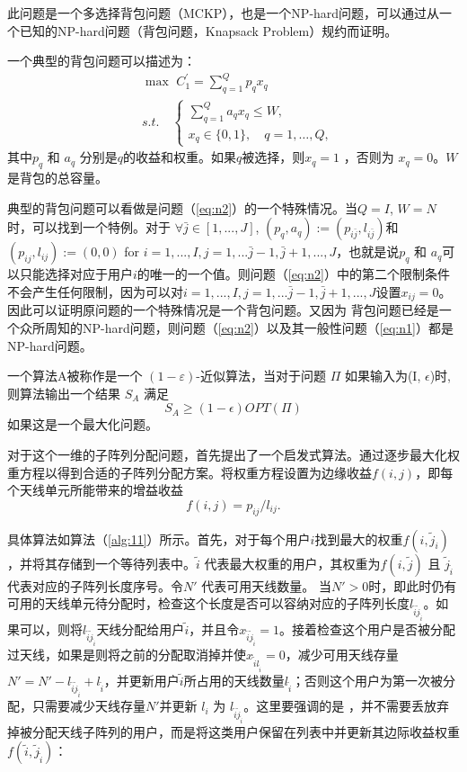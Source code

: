 此问题是一个多选择背包问题（MCKP），也是一个NP-hard问题，可以通过从一个已知的NP-hard问题（背包问题，Knapsack Problem）规约而证明。

一个典型的背包问题可以描述为：
\begin{equation}
\begin{split}
\label{eq:12}
&\max \,\, C_1^{'} = \sum\limits_{q=1}^{Q} p_{q} x_{q}\\
&s.t.\quad  \left\{\begin{array}{l}
\sum\limits_{q=1}^{Q} a_{q}x_{q}\leq W,\\
x_{q}\in\{0,1\}, \quad  q=1,\dots,Q,\end{array}\right.
\end{split}
\end{equation}
其中$p_q$ 和 $a_q$ 分别是$q$的收益和权重。如果$q$被选择，则$x_q=1$ ，否则为 $x_q=0$。$W$是背包的总容量。

典型的背包问题可以看做是问题（\ref{eq:n2}）的一个特殊情况。当$Q=I$, $W=N$时，可以找到一个特例。对于 $\forall \bar j \in [1,...,J]$, $(p_q,a_q):=(p_{i\bar j},l_{i\bar j})$和$(p_{ij},l_{ij}):= (0,0)$ for $i = 1,...,I, j= 1,...\bar j-1,\bar j+1,...,J$，也就是说$p_q$ 和 $a_q$可以只能选择对应于用户$i$的唯一的一个值。则问题（\ref{eq:n2}）中的第二个限制条件不会产生任何限制，因为可以对$i = 1,...,I, j= 1,...\bar j-1,\bar j+1,...,J$设置$x_{ij}=0$。因此可以证明原问题的一个特殊情况是一个背包问题。又因为 背包问题已经是一个众所周知的NP-hard问题，则问题（\ref{eq:n2}）以及其一般性问题（\ref{eq:n1}）都是NP-hard问题。

一个算法A被称作是一个 $(1-\varepsilon)$-近似算法，当对于问题 $\Pi$ 如果输入为(I, $\epsilon$)时, 则算法输出一个结果 $S_A$ 满足
\begin{equation}
S_A \geq (1-\epsilon)OPT(\Pi)
\end{equation}
如果这是一个最大化问题。


对于这个一维的子阵列分配问题，首先提出了一个启发式算法。通过逐步最大化权重方程以得到合适的子阵列分配方案。将权重方程设置为边缘收益$f(i,j)$，即每个天线单元所能带来的增益收益
\begin{equation}
f(i,j) = p_{ij}/l_{ij}.
\end{equation}

具体算法如算法（\ref{alg:11}）所示。首先，对于每个用户$i$找到最大的权重$f({i}, \tilde j_{i})$，并将其存储到一个等待列表中。$\tilde i$ 代表最大权重的用户，其权重为$f(i,\tilde j)$ 且 $\tilde j_{\tilde i}$ 代表对应的子阵列长度序号。令$N'$ 代表可用天线数量。 当$N'>0$时，即此时仍有可用的天线单元待分配时，检查这个长度是否可以容纳对应的子阵列长度$l_{\tilde i \tilde j_{\tilde i}}$。如果可以，则将$l_{\tilde i \tilde j_{\tilde i}}$天线分配给用户$\tilde i$，并且令$x_{\tilde i \tilde j_{\tilde i}} = 1$。接着检查这个用户是否被分配过天线，如果是则将之前的分配取消掉并使$x_{\tilde i l_{\tilde i}} = 0$，减少可用天线存量$N' = N' - l_{\tilde i \tilde j_{\tilde i}} + l_{\tilde i}$，并更新用户$\tilde i$所占用的天线数量$l_{\tilde i}$；否则这个用户为第一次被分配，只需要减少天线存量$N'$并更新 $l_i$ 为 $l_{\tilde i \tilde j_{\tilde i}}$。这里要强调的是 ，并不需要丢放弃掉被分配天线子阵列的用户，而是将这类用户保留在列表中并更新其边际收益权重$f({\tilde i}, \tilde j_{\tilde i})$：

